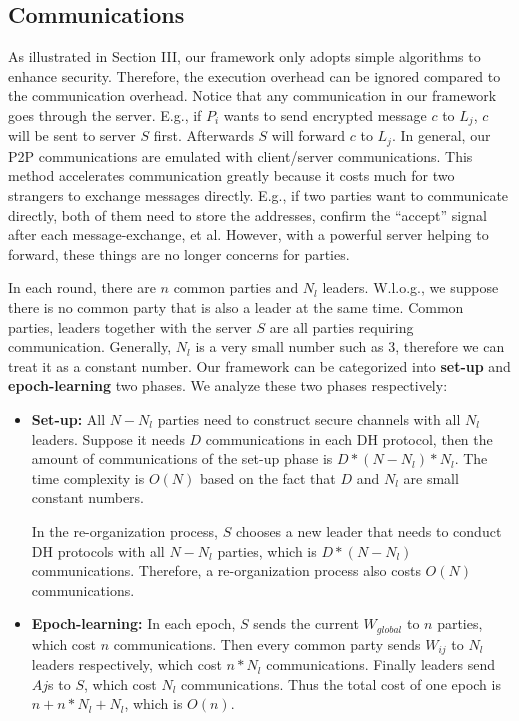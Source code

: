 \subsection{Communications}
As illustrated in Section III, our framework only adopts simple algorithms to enhance security. Therefore, the execution overhead can be ignored compared to the communication overhead. Notice that any communication in our framework goes through the server. E.g., if $P_i$ wants to send encrypted message $c$ to $L_j$, $c$ will be sent to server $S$ first. Afterwards $S$ will forward $c$ to $L_j$. In general, our P2P communications are emulated with client/server communications. This method accelerates communication greatly because it costs much for two strangers to exchange messages directly. E.g., if two parties want to communicate directly, both of them need to store the addresses, confirm the ``accept'' signal after each message-exchange, et al. However, with a powerful server helping to forward, these things are no longer concerns for parties.

In each round, there are $n$ common parties and $N_l$ leaders. W.l.o.g., we suppose there is no common party that is also a leader at the same time. Common parties, leaders together with the server $S$ are all parties requiring communication. Generally, $N_l$ is a very small number such as 3, therefore we can treat it as a constant number. Our framework can be categorized into \textbf{set-up} and \textbf{epoch-learning} two phases. We analyze these two phases respectively:

\begin{itemize}
    \item \textbf{Set-up:} All $N-N_l$ parties need to construct secure channels with all $N_l$ leaders. Suppose it needs $D$ communications in each DH protocol, then the amount of communications of the set-up phase is $D * (N-N_l) * N_l$. The time complexity is $O(N)$ based on the fact that $D$ and $N_l$ are small constant numbers.
    
    In the re-organization process, $S$ chooses a new leader that needs to conduct DH protocols with all $N-N_l$ parties, which is $D * (N-N_l)$ communications. Therefore, a re-organization process also costs $O(N)$ communications.
    
    \item \textbf{Epoch-learning:} In each epoch, $S$ sends the current $W_{global}$ to $n$ parties, which cost $n$ communications. Then every common party sends $W_{ij}$ to $N_l$ leaders respectively, which cost $n * N_l$ communications. Finally leaders send $Aj$s to $S$, which cost $N_l$ communications. Thus the total cost of one epoch is $n + n * N_l + N_l$, which is $O(n)$.
\end{itemize}

